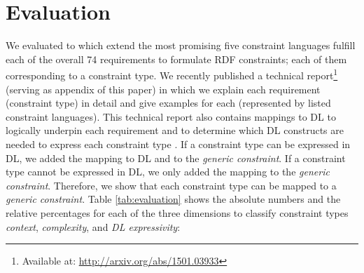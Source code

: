 \documentclass{llncs}
\newenvironment{evaluation-generic-overview}{
  \vspace{0cm}
	\begin{center}
  \begin{tabular}{l|c|c}
  \hline
  \textbf{Constraint Classes} & \textbf{\#} & \textbf{\%} \\
  \hline

}{
  \hline
  \end{tabular}
	\end{center}
}
\begin{document}
{%

\section{Evaluation}
\label{sec:evaluation}

We evaluated to which extend the most promising five constraint languages fulfill each of the overall 74 requirements to formulate RDF constraints; each of them corresponding to a constraint type.
We recently published a technical report\footnote{Available at: \url{http://arxiv.org/abs/1501.03933}} (serving as appendix of this paper) in which we explain each requirement (constraint type) in detail and give examples for each (represented by listed constraint languages).
This technical report also contains mappings to DL to logically underpin each requirement and to determine which DL constructs are needed to express each constraint type \cite{BoschNolleAcarEckert2015}.
If a constraint type can be expressed in DL, we added the mapping to DL and to the \emph{generic constraint}.
If a constraint type cannot be expressed in DL, we only added the mapping to the \emph{generic constraint}.
Therefore, we show that each constraint type can be mapped to a \emph{generic constraint}.
Table \ref{tab:evaluation} shows the absolute numbers and the relative percentages for each of the three dimensions to classify constraint types \emph{context}, \emph{complexity}, and \emph{DL expressivity}:


}
\end{document}
